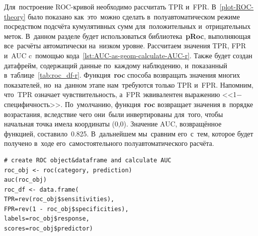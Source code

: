 \documentclass[]{scrreprt}
\begin{document}
Для~построение ROC-кривой необходимо рассчитать TPR и~FPR. В~\ref{plot-ROC-theory} было показано как~это~можно сделать в~полуавтоматическом режиме посредством подсчёта кумулятивных сумм для~положительных и~отрицательных меток. В~данном разделе будет использоваться библиотека~\textbf{pRoc}, выполняющая все~расчёты автоматически на~низком уровне. Рассчитаем значения TPR, FPR и~AUC c~помощью кода~\ref{lst:AUC-as-geom-calculate-AUC-r}. Также будет создан датафрейм, содержащий данные по~каждому наблюдению, и~показанный в~таблице~\ref{tab:roc_df-r}. Функция~\textbf{roc} способа возвращать значения многих показателей, но~на~данном этапе нам~требуются только TPR и~FPR. Напомним, что~TPR означает чувствительность, а~FPR эквивалентен выражению <<1$-$ специфичность>>. По~умолчанию, функция~\textbf{roc} возвращает значения в~порядке возрастания, вследствие чего они~были инвертированы для~того, чтобы начальная точка имела координаты (0,0). Значение AUC, возвращённое функцией, составило~0.825. В~дальнейшем мы~сравним его~с~тем, которое будет получено в~ходе его~самостоятельного полуавтоматического расчёта.
%
\begin{lstlisting}[float, caption = Расчёт AUC с~помошью библиотеки pRoc, firstnumber=1, label= lst:AUC-as-geom-calculate-AUC-r]
# create ROC object&dataframe and calculate AUC
roc_obj <- roc(category, prediction)
auc(roc_obj)
roc_df <- data.frame(
TPR=rev(roc_obj$sensitivities), 
FPR=rev(1 - roc_obj$specificities), 
labels=roc_obj$response, 
scores=roc_obj$predictor)
\end{lstlisting}
%
\end{document}
